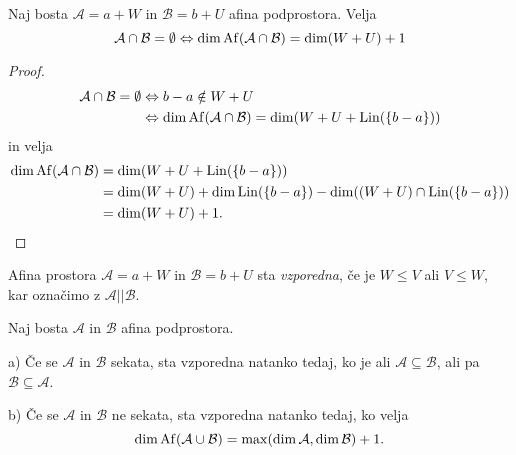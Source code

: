 \begin{trditev}
    Naj bosta $\mathcal{A} = a + W$ in $\mathcal{B} = b + U$ afina podprostora. Velja
    \[
    \mathcal{A} \cap \mathcal{B} = \emptyset \Leftrightarrow \dim \operatorname{Af} ( \mathcal{A} \cap \mathcal{B} ) = \dim (W + U) + 1
    \]
\end{trditev}

\begin{proof}
    \begin{align*}
        \mathcal{A} \cap \mathcal{B} = \emptyset &\Leftrightarrow b - a \notin W + U \\
        &\Leftrightarrow \dim \operatorname{Af} ( \mathcal{A} \cap \mathcal{B} ) = \dim (W + U + \operatorname{Lin} (\left\{b-a\right\})) 
    \end{align*}
    in velja
    \begin{align*}
        \dim \operatorname{Af} ( \mathcal{A} \cap \mathcal{B} ) &= \dim (W + U + \operatorname{Lin} (\left\{b-a\right\})) \\
        &= \dim (W + U) + \dim \operatorname{Lin} (\left\{b-a\right\}) - \dim ((W + U) \cap \operatorname{Lin} (\left\{b-a\right\})) \\
        &= \dim (W + U) + 1.
    \end{align*}
\end{proof}

\begin{definicija}
    Afina prostora $\mathcal{A} = a + W$ in $\mathcal{B} = b + U$ sta \emph{vzporedna}, če je $W \leq V$ ali $V \leq W$, kar označimo z $\mathcal{A} || \mathcal{B}$. 
\end{definicija}

\begin{trditev}
    Naj bosta $\mathcal{A}$ in $\mathcal{B}$ afina podprostora. 

    a) Če se $\mathcal{A}$ in $\mathcal{B}$ sekata, sta vzporedna natanko tedaj, ko je ali $\mathcal{A} \subseteq \mathcal{B}$, ali pa $\mathcal{B} \subseteq \mathcal{A}$.

    b) Če se $\mathcal{A}$ in $\mathcal{B}$ ne sekata, sta vzporedna natanko tedaj, ko velja 
    \[
        \dim \operatorname{Af} (\mathcal{A} \cup \mathcal{B}) = \max (\dim \mathcal{A}, \dim \mathcal{B}) + 1.
    \]
\end{trditev}

